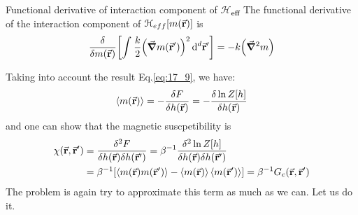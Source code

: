 \documentclass[../../Main/Main.tex]{subfiles}
\begin{document}
\begin{example}{Functional derivative of interaction component of \( \pmb{\mathcal{H}_{eff} } \)}{}
The functional derivative of the interaction component of \( \mathcal{H}_{eff} [m (\va{r})]\) is
  \begin{equation}
    \frac{\delta }{\delta m (\va{r})} \qty[ \int_{}^{}  \frac{k }{2} \qty(\va{\grad } m (\va{r}'))^2  \dd[d]{\va{r}'}     ]  =- k \qty(\va{\grad } ^2 m )
    \label{eq:17_9}
  \end{equation}
\end{example}
Taking into account the result Eq.\eqref{eq:17_9}, we have:
\begin{equation}
  \expval{m(\va{r})} = - \frac{\delta F}{\delta h (\va{r})} = - \frac{\delta \ln{Z[h]} }{\delta h (\va{r})}
\end{equation}
and one can show that the magnetic suscpetibility is
\begin{equation}
\begin{split}
  \chi  (\va{r},\va{r}') & = \frac{\delta ^2 F}{\delta h(\va{r}) \delta h(\va{r}')}
  = \beta ^{-1} \frac{\delta ^2 \ln{Z[h]} }{\delta h (\va{r}) \delta h (\va{r}')}\\
  & = \beta ^{-1} \qty[ \expval{m(\va{r}) m (\va{r}')} - \expval{m (\va{r})} \expval{m(\va{r}')}  ]
   = \beta ^{-1} G_c (\va{r},\va{r}')
\end{split}
\end{equation}
The problem is again try to approximate this term as much as we can. Let us do it.
\end{document}
